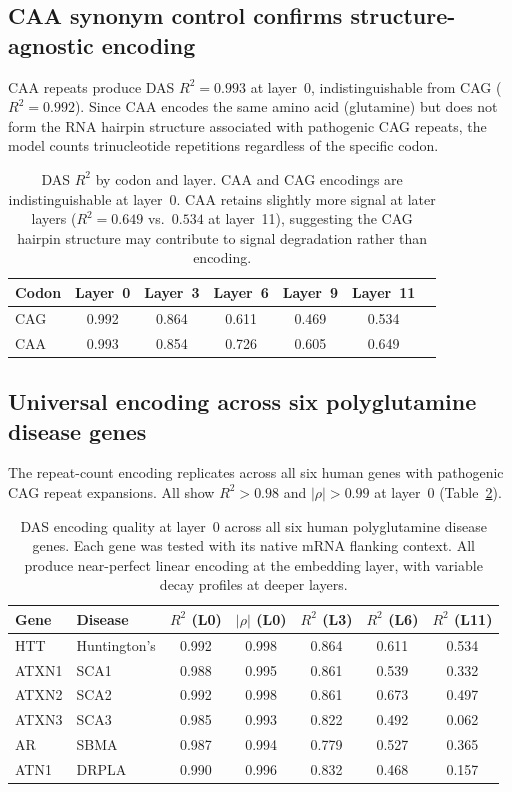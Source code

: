 \documentclass[11pt]{article}
\begin{document}
\subsection{CAA synonym control confirms structure-agnostic encoding}
\label{sec:caa}

CAA repeats produce DAS $R^2 = 0.993$ at layer~0, indistinguishable
from CAG ($R^2 = 0.992$). Since CAA encodes the same amino acid
(glutamine) but does not form the RNA hairpin structure associated
with pathogenic CAG repeats, the model counts trinucleotide
repetitions regardless of the specific codon.

\begin{table}[h]
\centering
\caption{DAS $R^2$ by codon and layer. CAA and CAG encodings are
indistinguishable at layer~0. CAA retains slightly more signal at
later layers ($R^2 = 0.649$ vs.\ $0.534$ at layer~11), suggesting
the CAG hairpin structure may contribute to signal degradation rather
than encoding.}
\label{tab:caa}
\begin{tabular}{lcccccc}
\toprule
Codon & Layer~0 & Layer~3 & Layer~6 & Layer~9 & Layer~11 \\
\midrule
CAG & 0.992 & 0.864 & 0.611 & 0.469 & 0.534 \\
CAA & 0.993 & 0.854 & 0.726 & 0.605 & 0.649 \\
\bottomrule
\end{tabular}
\end{table}

\subsection{Universal encoding across six polyglutamine disease genes}
\label{sec:crossdisease}

The repeat-count encoding replicates across all six human genes with
pathogenic CAG repeat expansions. All show $R^2 > 0.98$ and
$|\rho| > 0.99$ at layer~0 (Table~\ref{tab:crossdisease}).

\begin{table}[h]
\centering
\caption{DAS encoding quality at layer~0 across all six human
polyglutamine disease genes. Each gene was tested with its native
mRNA flanking context. All produce near-perfect linear encoding
at the embedding layer, with variable decay profiles at deeper layers.}
\label{tab:crossdisease}
\begin{tabular}{llccccc}
\toprule
Gene & Disease & $R^2$ (L0) & $|\rho|$ (L0) & $R^2$ (L3) & $R^2$ (L6) & $R^2$ (L11) \\
\midrule
HTT & Huntington's & 0.992 & 0.998 & 0.864 & 0.611 & 0.534 \\
ATXN1 & SCA1 & 0.988 & 0.995 & 0.861 & 0.539 & 0.332 \\
ATXN2 & SCA2 & 0.992 & 0.998 & 0.861 & 0.673 & 0.497 \\
ATXN3 & SCA3 & 0.985 & 0.993 & 0.822 & 0.492 & 0.062 \\
AR & SBMA & 0.987 & 0.994 & 0.779 & 0.527 & 0.365 \\
ATN1 & DRPLA & 0.990 & 0.996 & 0.832 & 0.468 & 0.157 \\
\bottomrule
\end{tabular}
\end{table}
\end{document}
